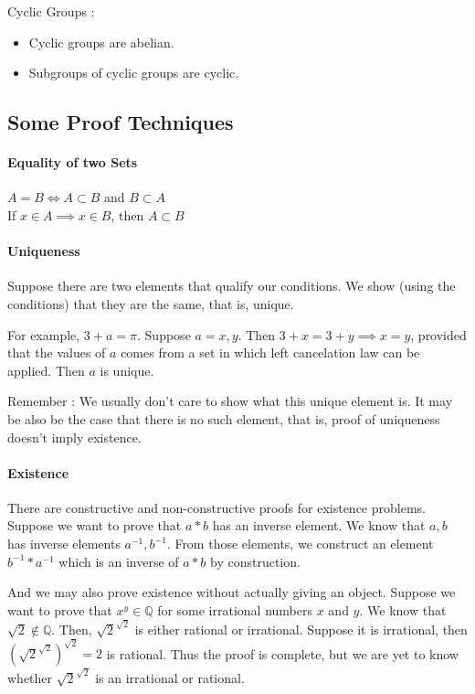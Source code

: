 \begin{remark}
	Cyclic Groups :
\begin{itemize}
	\item Cyclic groups are abelian.%
	\item Subgroups of cyclic groups are cyclic.%
\end{itemize}
\end{remark}

\subsection{Some Proof Techniques}
\paragraph{Equality of two Sets}
$A = B \iff A \subset B$ and $B \subset A$\\
If $x \in A \implies x \in B$, then $A \subset B$
\paragraph{Uniqueness}
	Suppose there are two elements that qualify our conditions.
	We show (using the conditions) that they are the same, that is, unique.

	For example, $3 + a = \pi$.
	Suppose $a = x,y$.
	Then $3 + x = 3 + y \implies x = y$, provided that the values of $a$ comes from a set in which left cancelation law can be applied.
	Then $a$ is unique.

	Remember : We usually don't care to show what this unique element is.
	It may be also be the case that there is no such element, that is, proof of uniqueness doesn't imply existence.

\paragraph{Existence}
	There are constructive and non-constructive proofs for existence problems.
	Suppose we want to prove that $a\ast b$ has an inverse element.
	We know that $a,b$ has inverse elements $a^{-1},b^{-1}$.
	From those elements, we construct an element $b^{-1} \ast a^{-1}$ which is an inverse of $a \ast b$ by construction.

	And we may also prove existence without actually giving an object.
	Suppose we want to prove that $x^y \in \mathbb{Q}$ for some irrational numbers $x$ and $y$.
	We know that $\sqrt{2} \notin \mathbb{Q}$.
	Then, $\sqrt{2}^{\sqrt{2}}$ is either rational or irrational.
	Suppose it is irrational, then $\left(\sqrt{2}^{\sqrt{2}}\right)^{\sqrt{2}} = 2$ is rational.
	Thus the proof is complete, but we are yet to know whether $\sqrt{2}^{\sqrt{2}}$ is an irrational or rational.

